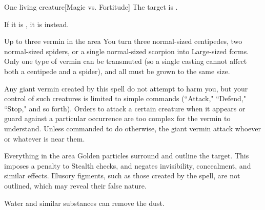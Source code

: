 \begin{spellheader}
    \spellrng{\rngmed}
\end{spellheader}
\begin{spelleffects}
    \begin{spelltarget}{One living creature}[Magic vs. Fortitude]
        \spellsuccess The target is \sickened.

        If it is \bloodied, it is \nauseated instead.
    \end{spelltarget}
\end{spelleffects}

\begin{spellheader}
    \spelldur{\durmed}
\end{spellheader}
\begin{spelleffects}
    \begin{spelltarget}{Up to three vermin in the area}
        \spelleffect You turn three normal-sized centipedes, two normal-sized spiders, or a single normal-sized scorpion into Large-sized forms. Only one type of vermin can be transmuted (so a single casting cannot affect both a centipede and a spider), and all must be grown to the same size.
        \par Any giant vermin created by this spell do not attempt to harm you, but your control of such creatures is limited to simple commands (``Attack," ``Defend," ``Stop," and so forth). Orders to attack a certain creature when it appears or guard against a particular occurrence are too complex for the vermin to understand. Unless commanded to do otherwise, the giant vermin attack whoever or whatever is near them.
    \end{spelltarget}
\end{spelleffects}

\begin{spellheader}
    \spelldur{\durshort}
\end{spellheader}
\begin{spelleffects}
    \begin{spelltarget}{Everything in the area}
        \spelleffect Golden particles surround and outline the target. This imposes a  penalty to Stealth checks, and negates invisibility, concealment, and similar effects. Illusory figments, such as those created by the  spell, are not outlined, which may reveal their false nature.
    \end{spelltarget}
\end{spelleffects}
\begin{spellfooter}
    \spellnotes Water and similar substances can remove the dust.
\end{spellfooter}

